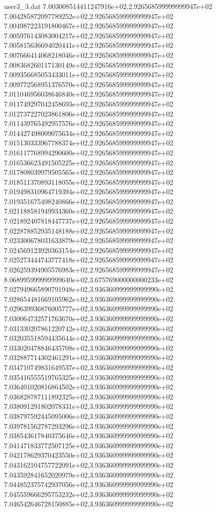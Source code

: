 \begin{filecontents}{user3_3.dat}
7.003008514411247916e+02,2.926568599999999947e+02
7.004285872097789252e+02,2.926568599999999947e+02
7.004987223191800467e+02,2.926568599999999947e+02
7.005976143083004217e+02,2.926568599999999947e+02
7.005815636694020441e+02,2.926568599999999947e+02
7.007666414068218046e+02,2.926568599999999947e+02
7.008368260117130149e+02,2.926568599999999947e+02
7.009356685053433011e+02,2.926568599999999947e+02
7.009772568951376570e+02,2.926568599999999947e+02
7.011046956038646840e+02,2.926568599999999947e+02
7.011749297042458693e+02,2.926568599999999947e+02
7.012737227023861806e+02,2.926568599999999947e+02
7.011439765492957576e+02,2.926568599999999947e+02
7.014427498009075634e+02,2.926568599999999947e+02
7.015130333967788374e+02,2.926568599999999947e+02
7.016117768994290600e+02,2.926568599999999947e+02
7.016536623491505225e+02,2.926568599999999947e+02
7.017808039979505565e+02,2.926568599999999947e+02
7.018511370893118055e+02,2.926568599999999947e+02
7.019498310964719394e+02,2.926568599999999947e+02
7.019351675498240866e+02,2.926568599999999947e+02
7.021188581949934360e+02,2.926568599999999947e+02
7.021892407818447737e+02,2.926568599999999947e+02
7.022878852935148188e+02,2.926568599999999947e+02
7.023300678031633879e+02,2.926568599999999947e+02
7.024569123920363154e+02,2.926568599999999947e+02
7.025273444743777418e+02,2.926568599999999947e+02
7.026259394905576983e+02,2.926568599999999947e+02
8.068995999999999640e+02,3.675769000000000233e+02
7.027949665890791948e+02,3.936360999999999990e+02
7.028654481669105962e+02,3.936360999999999990e+02
7.029639936876005777e+02,3.936360999999999990e+02
7.030064732571763670e+02,3.936360999999999990e+02
7.031330207861220742e+02,3.936360999999999990e+02
7.032035518594435644e+02,3.936360999999999990e+02
7.033020478846435708e+02,3.936360999999999990e+02
7.032887714302461291e+02,3.936360999999999990e+02
7.034710749831649537e+02,3.936360999999999990e+02
7.035416555519765325e+02,3.936360999999999990e+02
7.036401020816864502e+02,3.936360999999999990e+02
7.036828787111892325e+02,3.936360999999999990e+02
7.038091291802078331e+02,3.936360999999999990e+02
7.038797592445095006e+02,3.936360999999999990e+02
7.039781562787293296e+02,3.936360999999999990e+02
7.038543617840375646e+02,3.936360999999999990e+02
7.041471833772507125e+02,3.936360999999999990e+02
7.042178629370423550e+02,3.936360999999999990e+02
7.043162104757722091e+02,3.936360999999999990e+02
7.043592841652020979e+02,3.936360999999999990e+02
7.044852375742937056e+02,3.936360999999999990e+02
7.045559666295753232e+02,3.936360999999999990e+02
7.046542646728150885e+02,3.936360999999999990e+02

\end{filecontents}
